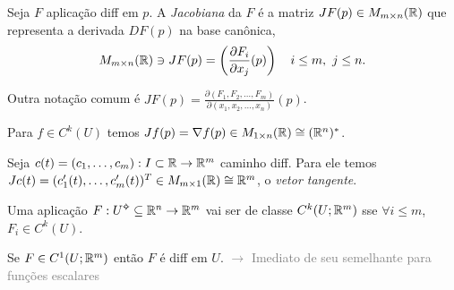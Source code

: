 

\begin{definition}
    Seja \(F\) aplicação diff em \(p\). A \emph{Jacobiana} da \(F\) é a matriz \(JF(p) \in M_{m\times n }(\mathbb{R})\) que representa a derivada \(DF(p)\) na base canônica, 
    \[M_{m\times n}(\mathbb{R}) \ni JF(p) = \left(\frac{\partial F_i}{\partial x_j}(p)\right) \ \ \  i\leq m, \ j\leq n. \] 
\end{definition}
\begin{note} 
   Outra notação comum é \(JF(p) = \frac{\partial (F_1,F_2,\ldots,F_m)}{\partial (x_1,x_2, \ldots , x_n)}(p)\). 
\end{note}
\Ei

\begin{example}
    Para \(f\in C^k(U)\) temos \(Jf(p) = \nabla f(p) \in M_{1\times n} (\mathbb{R}) \cong (\mathbb{R}^n)^*\).  
\end{example}
\begin{example}
    Seja \(c(t) = (c_1, \ldots, c_m):I \subset \mathbb{R} \to \mathbb{R}^m\) caminho diff. Para ele temos \(Jc(t) = (c_1'(t), \ldots, c_m'(t))^T \in M_{m\times 1}(\mathbb{R})\cong \mathbb{R}^m\), o \emph{vetor tangente}. 
\end{example}

\Ef

\begin{definition}
    Uma aplicação \(F:U\ab\subseteq \R^n\to \R^m\) vai ser de classe \(C^k(U; \mathbb{R}^m)\) sse \(\forall i\leq m\), \(F_i\in C^k(U)\). %
\end{definition}
\begin{corollary}
    Se \(F\in C^1(U;\mathbb{R}^m)\) então \(F\) é diff em \(U\). \textcolor{gray}{\(\rightarrow\) Imediato de seu semelhante para funções escalares }
\end{corollary}

